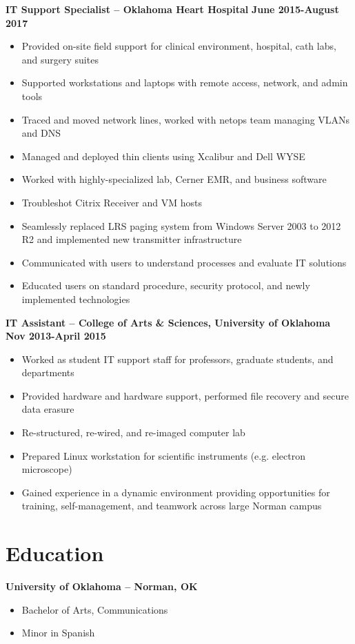 \documentclass[line]{res}
\begin{document}
\begin{resume}
\textbf{IT Support Specialist -- Oklahoma Heart Hospital}
\newline
\textbf{June 2015-August 2017}
\begin{itemize}
	\item Provided on-site field support for clinical environment, hospital, cath labs, and surgery suites
	\item Supported workstations and laptops with remote access, network, and admin tools
	\item Traced and moved network lines, worked with netops team managing VLANs and DNS		
	\item Managed and deployed thin clients using Xcalibur and Dell WYSE
	\item Worked with highly-specialized lab, Cerner EMR, and business software
	\item Troubleshot Citrix Receiver and VM hosts
	\item Seamlessly replaced LRS paging system from Windows Server 2003 to 2012 R2 and implemented new transmitter infrastructure
	\item Communicated with users to understand processes and evaluate IT solutions
	\item Educated users on standard procedure, security protocol, and newly implemented technologies
\end{itemize}


\textbf{IT Assistant -- College of Arts \& Sciences, University of Oklahoma}
\newline
\textbf{Nov 2013-April 2015}
\begin{itemize}
	\item Worked as student IT support staff for professors, graduate students, and departments
	\item Provided hardware and hardware support, performed file recovery and secure data erasure
	\item Re-structured, re-wired, and re-imaged computer lab
	\item Prepared Linux workstation for scientific instruments (e.g. electron microscope)		
	\item Gained experience in a dynamic environment providing opportunities for training, self-management, and teamwork across large Norman campus
\end{itemize}


\section{Education}
\textbf{University of Oklahoma -- Norman, OK}
\begin{itemize}
	\item Bachelor of Arts, Communications
	\item Minor in Spanish
\end{itemize}



\end{resume}
\end{document}
